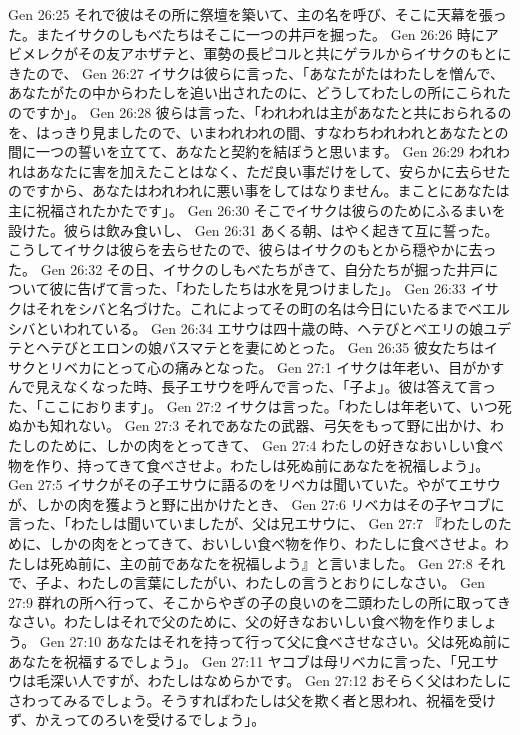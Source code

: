 Gen 26:25  それで彼はその所に祭壇を築いて、主の名を呼び、そこに天幕を張った。またイサクのしもべたちはそこに一つの井戸を掘った。
Gen 26:26  時にアビメレクがその友アホザテと、軍勢の長ピコルと共にゲラルからイサクのもとにきたので、
Gen 26:27  イサクは彼らに言った、「あなたがたはわたしを憎んで、あなたがたの中からわたしを追い出されたのに、どうしてわたしの所にこられたのですか」。
Gen 26:28  彼らは言った、「われわれは主があなたと共におられるのを、はっきり見ましたので、いまわれわれの間、すなわちわれわれとあなたとの間に一つの誓いを立てて、あなたと契約を結ぼうと思います。
Gen 26:29  われわれはあなたに害を加えたことはなく、ただ良い事だけをして、安らかに去らせたのですから、あなたはわれわれに悪い事をしてはなりません。まことにあなたは主に祝福されたかたです」。
Gen 26:30  そこでイサクは彼らのためにふるまいを設けた。彼らは飲み食いし、
Gen 26:31  あくる朝、はやく起きて互に誓った。こうしてイサクは彼らを去らせたので、彼らはイサクのもとから穏やかに去った。
Gen 26:32  その日、イサクのしもべたちがきて、自分たちが掘った井戸について彼に告げて言った、「わたしたちは水を見つけました」。
Gen 26:33  イサクはそれをシバと名づけた。これによってその町の名は今日にいたるまでベエルシバといわれている。
Gen 26:34  エサウは四十歳の時、ヘテびとベエリの娘ユデテとヘテびとエロンの娘バスマテとを妻にめとった。
Gen 26:35  彼女たちはイサクとリベカにとって心の痛みとなった。
Gen 27:1  イサクは年老い、目がかすんで見えなくなった時、長子エサウを呼んで言った、「子よ」。彼は答えて言った、「ここにおります」。
Gen 27:2  イサクは言った。「わたしは年老いて、いつ死ぬかも知れない。
Gen 27:3  それであなたの武器、弓矢をもって野に出かけ、わたしのために、しかの肉をとってきて、
Gen 27:4  わたしの好きなおいしい食べ物を作り、持ってきて食べさせよ。わたしは死ぬ前にあなたを祝福しよう」。
Gen 27:5  イサクがその子エサウに語るのをリベカは聞いていた。やがてエサウが、しかの肉を獲ようと野に出かけたとき、
Gen 27:6  リベカはその子ヤコブに言った、「わたしは聞いていましたが、父は兄エサウに、
Gen 27:7  『わたしのために、しかの肉をとってきて、おいしい食べ物を作り、わたしに食べさせよ。わたしは死ぬ前に、主の前であなたを祝福しよう』と言いました。
Gen 27:8  それで、子よ、わたしの言葉にしたがい、わたしの言うとおりにしなさい。
Gen 27:9  群れの所へ行って、そこからやぎの子の良いのを二頭わたしの所に取ってきなさい。わたしはそれで父のために、父の好きなおいしい食べ物を作りましょう。
Gen 27:10  あなたはそれを持って行って父に食べさせなさい。父は死ぬ前にあなたを祝福するでしょう」。
Gen 27:11  ヤコブは母リベカに言った、「兄エサウは毛深い人ですが、わたしはなめらかです。
Gen 27:12  おそらく父はわたしにさわってみるでしょう。そうすればわたしは父を欺く者と思われ、祝福を受けず、かえってのろいを受けるでしょう」。
